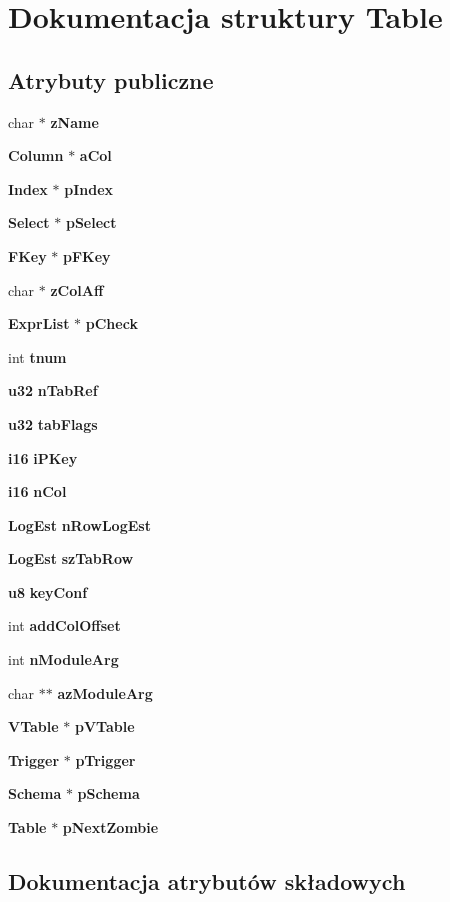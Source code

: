 \section{Dokumentacja struktury Table}
\label{struct_table}
\subsection*{Atrybuty publiczne}
\begin{DoxyCompactItemize}
\item 
char $\ast$ \textbf{ z\+Name}
\item 
\textbf{ Column} $\ast$ \textbf{ a\+Col}
\item 
\textbf{ Index} $\ast$ \textbf{ p\+Index}
\item 
\textbf{ Select} $\ast$ \textbf{ p\+Select}
\item 
\textbf{ F\+Key} $\ast$ \textbf{ p\+F\+Key}
\item 
char $\ast$ \textbf{ z\+Col\+Aff}
\item 
\textbf{ Expr\+List} $\ast$ \textbf{ p\+Check}
\item 
int \textbf{ tnum}
\item 
\textbf{ u32} \textbf{ n\+Tab\+Ref}
\item 
\textbf{ u32} \textbf{ tab\+Flags}
\item 
\textbf{ i16} \textbf{ i\+P\+Key}
\item 
\textbf{ i16} \textbf{ n\+Col}
\item 
\textbf{ Log\+Est} \textbf{ n\+Row\+Log\+Est}
\item 
\textbf{ Log\+Est} \textbf{ sz\+Tab\+Row}
\item 
\textbf{ u8} \textbf{ key\+Conf}
\item 
int \textbf{ add\+Col\+Offset}
\item 
int \textbf{ n\+Module\+Arg}
\item 
char $\ast$$\ast$ \textbf{ az\+Module\+Arg}
\item 
\textbf{ V\+Table} $\ast$ \textbf{ p\+V\+Table}
\item 
\textbf{ Trigger} $\ast$ \textbf{ p\+Trigger}
\item 
\textbf{ Schema} $\ast$ \textbf{ p\+Schema}
\item 
\textbf{ Table} $\ast$ \textbf{ p\+Next\+Zombie}
\end{DoxyCompactItemize}


\subsection{Dokumentacja atrybutów składowych}
\mbox{\label{struct_table_a87ec3b706ecf9545bd9ed582a12ce3e7}} 
